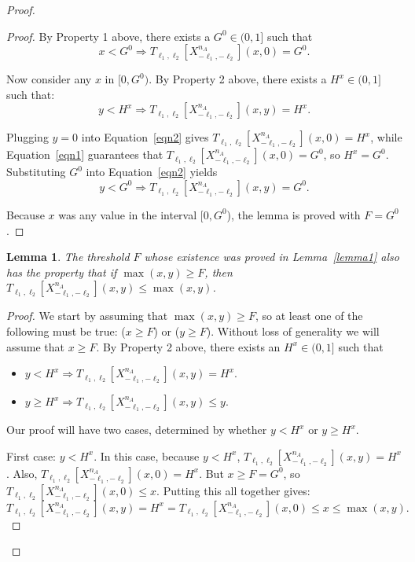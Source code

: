 \documentclass{article}
\newcommand{\xnmltwo}{X^{n_A}_{-\ell_1, -\ell_2}}
\newtheorem{lemma}[theorem]{Lemma}
\begin{document}
\begin{proof}
\begin{proof}
\noindent By Property 1 above, there exists a $G^0 \in (0, 1]$ such that 
\begin{equation}\label{eqn1}
x   < G^{0} \Rightarrow T_{\ell_1, \ell_2}[\xnmltwo](x,0) = G^{0}.
\end{equation}

\noindent Now consider any $x$ in $[0,G^0)$.
By Property 2 above, there exists a $H^{x} \in (0, 1]$ such that:
\begin{equation}\label{eqn2}
y   < H^{x} \Rightarrow T_{\ell_1, \ell_2}[\xnmltwo](x,y) = H^{x}.
\end{equation}

\noindent Plugging $y=0$ into Equation~\eqref{eqn2} gives
$T_{\ell_1, \ell_2}[\xnmltwo](x,0) = H^{x}$, while Equation~\eqref{eqn1} guarantees that
$T_{\ell_1, \ell_2}[\xnmltwo](x,0) = G^0$, so $H^{x} = G^0$. Substituting $G^0$
into Equation~\eqref{eqn2} yields 
\begin{equation}\label{eqn3}
y   < G^0 \Rightarrow T_{\ell_1, \ell_2}[\xnmltwo](x,y) = G^0.
\end{equation}

\noindent Because $x$ was any value in the interval $[0,G^0$), the lemma is proved with $F = G^0$.
\end{proof}

\begin{lemma}\label{lemma2}
The threshold $F$ whose existence was proved in Lemma~\ref{lemma1} also has the
property that if $\max(x,y) \ge F$, then $T_{\ell_1, \ell_2}[\xnmltwo](x,y) \le \max(x,y)$.

\end{lemma}
\begin{proof}
\noindent We start by assuming that $\max(x,y) \ge F$, so at least one of the following must be true: 
($x \ge F$) or ($y \ge F$). 
Without loss of generality we will assume that $x \ge F$. 
\noindent By Property 2 above, there exists an $H^{x} \in (0, 1]$ such that
\begin{itemize}
\item $y   < H^{x} \Rightarrow T_{\ell_1, \ell_2}[\xnmltwo](x,y) = H^{x}$.
\item $y \ge H^{x} \Rightarrow T_{\ell_1, \ell_2}[\xnmltwo](x,y) \le y$.
\end{itemize}

\noindent Our proof will have two cases, determined by whether 
$y < H^x$ or $y \ge H^x$.

\noindent First case: $y < H^x$. In this case, because $y < H^x$, $T_{\ell_1, \ell_2}[\xnmltwo](x,y) = H^x$. Also, $T_{\ell_1, \ell_2}[\xnmltwo](x,0) = H^x$.
But $x \ge F = G^0$, so $T_{\ell_1, \ell_2}[\xnmltwo](x,0) \le x$. Putting this all together gives:
\begin{equation}
T_{\ell_1, \ell_2}[\xnmltwo](x,y) = H^x = T_{\ell_1, \ell_2}[\xnmltwo](x,0) \le x \le \max(x,y).
\end{equation}


\end{proof}
\end{proof}
\end{document}
